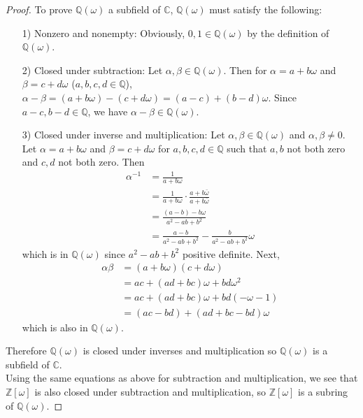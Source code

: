 \documentclass[12pt]{amsart}
\theoremstyle{definition}
\theoremstyle{remark}
\begin{document}
\begin{proof}
    To prove $\mathbb{Q}(\omega)$ a subfield of $\mathbb{C}$, $\mathbb{Q}(\omega)$ must satisfy the following:
    \begin{itemize}
        \item[1)] Nonzero and nonempty: Obviously, $0,1\in\mathbb{Q}(\omega)$ by the definition of $\mathbb{Q}(\omega)$.
        \item[2)] Closed under subtraction: Let $\alpha,\beta\in\mathbb{Q}(\omega)$. Then for $\alpha= a + b\omega$ and $\beta= c + d\omega$ ($a,b,c,d\in\mathbb{Q}$), $\alpha-\beta = (a+b\omega)-(c+d\omega) = (a-c) + (b-d)\omega$. Since $a-c,b-d\in\mathbb{Q}$, we have $\alpha-\beta\in\mathbb{Q}(\omega)$.
        \item[3)] Closed under inverse and multiplication: Let $\alpha,\beta\in\mathbb{Q}(\omega)$ and $\alpha,\beta\not=0$. Let $\alpha=a+b\omega$ and $\beta=c+d\omega$ for $a,b,c,d\in\mathbb{Q}$ such that $a,b$ not both zero and $c,d$ not both zero. Then 
        \begin{align*}
            \alpha^{-1} &= \frac{1}{a+b\omega}\\
            &= \frac{1}{a+b\omega}\cdot\frac{a+b\bar{\omega}}{a+b\bar{\omega}}\\
            &= \frac{(a-b)-b\omega}{a^2-ab+b^2}\\
            \tag{2}&= \frac{a-b}{a^2-ab+b^2} - \frac{b}{a^2-ab+b^2}\omega
        \end{align*}
        which is in $\mathbb{Q}(\omega)$ since $a^2-ab+b^2$ positive definite. Next,
        \begin{align*}
            \alpha\beta &= (a+b\omega)(c+d\omega)\\
            &= ac + (ad+bc)\omega + bd\omega^2\\
            &= ac + (ad+bc)\omega + bd(-\omega-1)\\
            \tag{3}&= (ac-bd) + (ad+bc-bd)\omega
        \end{align*}
        which is also in $\mathbb{Q}(\omega)$. 
    \end{itemize}
    Therefore $\mathbb{Q}(\omega)$ is closed under inverses and multiplication so $\mathbb{Q}(\omega)$ is a subfield of $\mathbb{C}$.\\
    
    Using the same equations as above for subtraction and multiplication, we see that $\mathbb{Z}[\omega]$ is also closed under subtraction and multiplication, so $\mathbb{Z}[\omega]$ is a subring of $\mathbb{Q}(\omega)$.
\end{proof}
\end{document}
